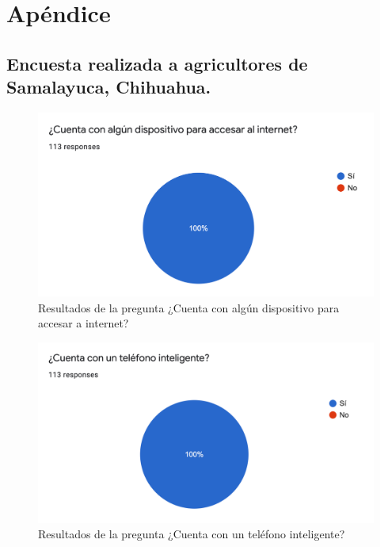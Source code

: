\section{Apéndice}
\subsection{Encuesta realizada a agricultores de Samalayuca, Chihuahua.}
\label{encuesta}

\begin{figure}[!h]
	\centering
	\includegraphics[width=.95\linewidth]{imagenes/encuesta/pregunta_1.png}
	\caption{Resultados de la pregunta ¿Cuenta con algún dispositivo para accesar a internet?}
	\label{fig:pregunta_1_tiene_internet}
\end{figure}

\begin{figure}[!h]
	\centering
	\includegraphics[width=.95\linewidth]{imagenes/encuesta/pregunta_2.png}
	\caption{Resultados de la pregunta ¿Cuenta con un teléfono inteligente?}
	\label{fig:pregunta_2_tiene_telefono}
\end{figure}

